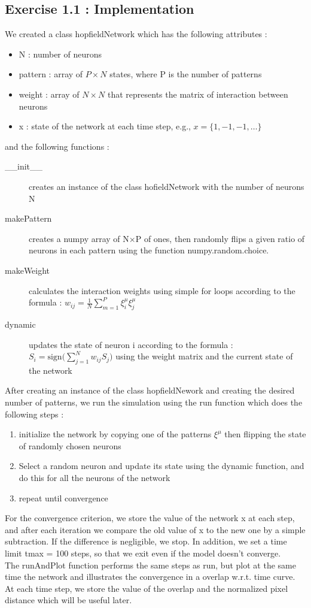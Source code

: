 \subsection{Exercise 1.1 : Implementation}
We created a class hopfieldNetwork which has the following attributes : 
\begin{itemize}
\item N : number of neurons 
\item pattern : array of $P\times N$ states, where P is the number of patterns 
\item weight : array of $N\times N$ that represents the matrix of interaction between neurons
\item x : state of the network at each time step, e.g.,  $x = \{1, -1, -1, \dots\}$
\end{itemize}
and the following functions : 
\begin{description}
\item [\_\_init\_\_] creates an instance of the class hofieldNetwork with the number of neurons N 
\item [makePattern] creates a numpy array of N$\times$P of ones, then randomly flips a given ratio of neurons in each pattern using the function numpy.random.choice. 
\item [makeWeight] calculates the interaction weights using simple for loops according to the formula : $w_{ij} = \frac{1}{N}\sum_{m=1}^P \xi_i^{\mu} \xi_j^{\mu}$
\item[dynamic] updates the state of neuron i according to the formula : $S_i = \textrm{sign}\big(\sum_{j=1}^N w_{ij}S_j\big)$ using the weight matrix and the current state of the network

\end{description}

After creating an instance of the class hopfieldNework and creating the desired number of patterns, we run the simulation using the run function which does the following steps : 
\begin{enumerate}
\item initialize the network by copying one of the patterns $\xi^{\mu}$ then flipping the state of randomly chosen neurons 
\item Select a random neuron and update its state using the dynamic function, and do this for all the neurons of the network
\item repeat until convergence
\end{enumerate}
For the convergence criterion, we store the value of the network x at each step, and after each iteration we compare the old value of x to the new one by a simple subtraction. If the difference is negligible, we stop. In addition, we set a time limit tmax = 100 steps, so that we exit even if the model doesn't converge. \\
The runAndPlot function performs the same steps as run, but plot at the same time the network and illustrates the convergence in a overlap w.r.t. time curve. \\
At each time step, we store the value of the overlap and the normalized pixel distance which will be useful later. \\
 
